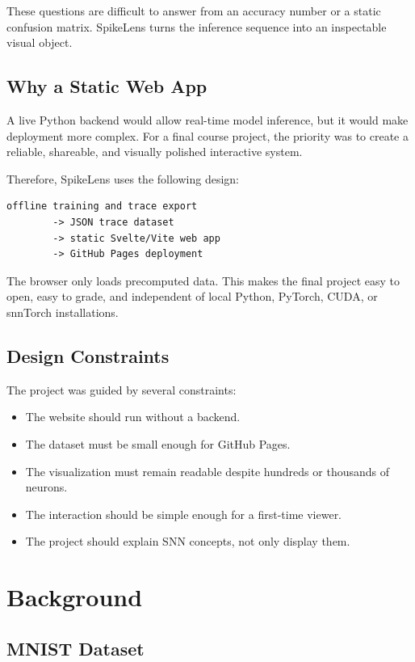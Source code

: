 \documentclass[11pt,a4paper]{article}
\newcommand{\projecttitle}{SpikeLens}
\begin{document}
These questions are difficult to answer from an accuracy number or a static confusion matrix. \projecttitle{} turns the inference sequence into an inspectable visual object.

\subsection{Why a Static Web App}

A live Python backend would allow real-time model inference, but it would make deployment more complex. For a final course project, the priority was to create a reliable, shareable, and visually polished interactive system.

Therefore, \projecttitle{} uses the following design:

\begin{lstlisting}
offline training and trace export
        -> JSON trace dataset
        -> static Svelte/Vite web app
        -> GitHub Pages deployment
\end{lstlisting}

The browser only loads precomputed data. This makes the final project easy to open, easy to grade, and independent of local Python, PyTorch, CUDA, or snnTorch installations.

\subsection{Design Constraints}

The project was guided by several constraints:

\begin{itemize}
    \item The website should run without a backend.
    \item The dataset must be small enough for GitHub Pages.
    \item The visualization must remain readable despite hundreds or thousands of neurons.
    \item The interaction should be simple enough for a first-time viewer.
    \item The project should explain SNN concepts, not only display them.
\end{itemize}

\section{Background}

\subsection{MNIST Dataset}
\end{document}
